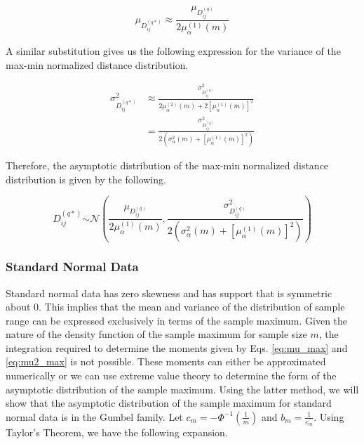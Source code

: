 \documentclass[10pt,letterpaper]{article}\usepackage[]{graphicx}\usepackage[]{color}
\begin{document}
\begin{equation}\label{eq:max-min_D_mean_symm}
\mu_{D^{(q*)}_{ij}} \approx \frac{\mu_{D^{(q)}_{ij}}}{2\mu^{(1)}_\alpha(m)}
\end{equation}

A similar substitution gives us the following expression for the variance of the max-min normalized distance distribution.

\begin{equation}\label{eq:max-min_D_var_symm}
\begin{aligned}
\sigma^2_{D^{(q*)}_{ij}} &\approx \frac{\sigma^2_{D^{(q)}_{ij}}}{2\mu^{(2)}_\alpha(m) + 2\left[\mu^{(1)}_\alpha(m)\right]^2} \\
&= \frac{\sigma^2_{D^{(q)}_{ij}}}{2\left(\sigma^2_\alpha(m) + \left[\mu^{(1)}_\alpha(m)\right]^2\right)}
\end{aligned}
\end{equation}

Therefore, the asymptotic distribution of the max-min normalized distance distribution is given by the following.

\begin{equation}\label{eq:max-min_DDistr}
D^{(q*)}_{ij} \overset{.}{\sim} \mathcal{N}\left(\frac{\mu_{D^{(q)}_{ij}}}{2\mu^{(1)}_\alpha(m)}, \frac{\sigma^2_{D^{(q)}_{ij}}}{2\left(\sigma^2_\alpha(m) + \left[\mu^{(1)}_\alpha(m)\right]^2\right)}\right)
\end{equation}

\subsubsection{Standard Normal Data}

Standard normal data has zero skewness and has support that is symmetric about 0. This implies that the mean and variance of the distribution of sample range can be expressed exclusively in terms of the sample maximum. Given the nature of the density function of the sample maximum for sample size $m$, the integration required to determine the moments given by Eqs. \ref{eq:mu_max} and \ref{eq:mu2_max} is not possible. These moments can either be approximated numerically or we can use extreme value theory to determine the form of the asymptotic distribution of the sample maximum. Using the latter method, we will show that the asymptotic distribution of the sample maximum for standard normal data is in the Gumbel family. Let $c_m = -\Phi^{-1}\left(\frac{1}{m}\right)$ and $b_m = \frac{1}{c_m}$. Using Taylor's Theorem, we have the following expansion.
\end{document}
